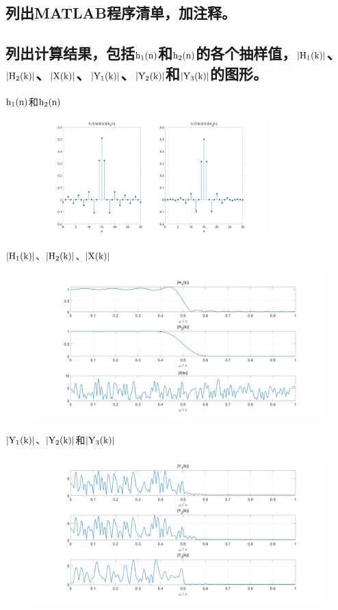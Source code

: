 \documentclass{../source/Experiment}
\begin{document}
\subsection{列出MATLAB程序清单，加注释。}



\subsection{列出计算结果，包括$\rm h_1(n)$和$\rm h_2(n)$的各个抽样值，$\rm |H_1(k)|$、$\rm |H_2(k)|$、$\rm |X(k)|$、$\rm |Y_1(k)|$、$\rm |Y_2(k)|$和$\rm |Y_3(k)|$的图形。}

$\rm h_1(n)$和$\rm h_2(n)$
\begin{figure}[H]
    \centering
    \includegraphics[width = 0.8\textwidth]{src/exp4-5-2-1.png}
\end{figure}

$\rm |H_1(k)|$、$\rm |H_2(k)|$、$\rm |X(k)|$
\begin{figure}[H]
    \centering
    \includegraphics[width = 1\textwidth]{src/exp4-5-2-2.png}
\end{figure}

$\rm |Y_1(k)|$、$\rm |Y_2(k)|$和$\rm |Y_3(k)|$
\begin{figure}[H]
    \centering
    \includegraphics[width = 1\textwidth]{src/exp4-5-2-3.png}
\end{figure}
\end{document}

